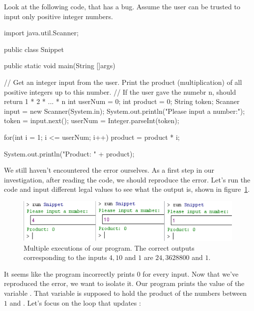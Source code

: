 \begin{example}
Look at the following code, that has a bug. Assume the user can be trusted to input only positive integer numbers. 

\begin{code}
import java.util.Scanner;

public class Snippet{
    public static void main(String []args){
        // Get an integer input from the user. Print the product (multiplication) of all positive integers up to this number.
        // If the user gave the numebr n, should return 1 * 2 * ... * n
        int userNum = 0;
        int product = 0;
        String token;
        Scanner input = new Scanner(System.in);
        System.out.println("Please input a number:");
        token = input.next();
        userNum = Integer.parseInt(token);
        
        for(int i = 1; i <= userNum; i++){
            product = product * i;
        }
        
        System.out.println("Product: " + product);
    }
}
\end{code}

\end{example}

We still haven't encountered the error ourselves. As a first step in our investigation, after reading the code, we should reproduce the error. Let's run the code and input different legal values to see what the output is, shown in figure~\ref{fig:bug}.

\begin{figure}[h!]
\centering
\includegraphics[scale=0.8]{lectures/images/bug_outputs.PNG}
\caption{Multiple executions of our program. The correct outputs corresponding to the inputs $4,10$ and $1$ are $24, 3628800$ and $1$.}
\label{fig:bug}
\end{figure}

It seems like the program incorrectly prints $0$ for every input. Now that we've reproduced the error, we want to isolate it. Our program prints the value of the variable . That variable is supposed to hold the product of the numbers between $1$ and . Let's focus on the loop that updates :

